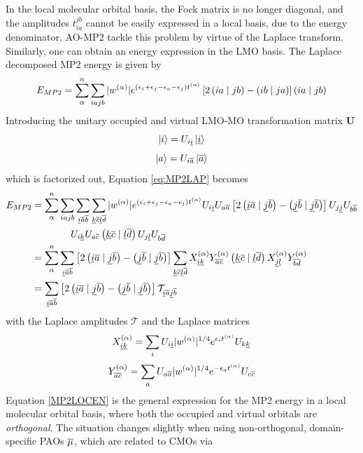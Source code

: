 In the local molecular orbital basis, the Fock matrix is no longer diagonal, and the amplitudes $t_{ia}^{jb}$ cannot be easily expressed in a local basis, due to the energy denominator. AO-MP2 tackle this problem by virtue of the Laplace transform. Similarly, one can obtain an energy expression in the LMO basis. The Laplace decomposed MP2 energy is given by
\begin{equation}
E_{MP2} = \sum_{\alpha}^{n} \sum_{iajb} |w^{(\alpha)}| e^{(\epsilon_i + \epsilon_j - \epsilon_a - \epsilon_j)t^{(\alpha)}} \left[2\left( ia \mid jb \right) - \left( ib \mid ja \right)\right] \left( ia \mid jb \right)  
\label{eq:MP2LAP}
\end{equation}
\noindent Introducing the unitary occupied and virtual LMO-MO transformation matrix $\mathbf{U}$ 
\begin{equation}
\ket{i} = U_{i\underline{i}} \ket{\underline{i}}
\end{equation} 
\begin{equation}
\ket{a} = U_{i\overline{a}} \ket{\overline{a}}
\end{equation}
\noindent which is factorized out, Equation \ref{eq:MP2LAP} becomes
\begin{equation}
\begin{split}
E_{MP2} &= \sum_{\alpha}^{n} \sum_{iajb} \sum_{\underline{i}\overline{a}\overline{b}} \sum_{\underline{k}\overline{c}\underline{l}\overline{d}} |w^{(\alpha)}| e^{(\epsilon_i + \epsilon_j - \epsilon_a - \epsilon_j)t^{(\alpha)}} U_{i\underline{i}} U_{a\overline{a}} \left[2\left( \underline{i}\overline{a} \mid \underline{j}\overline{b} \right) - \left( \underline{j}\overline{b} \mid \underline{j}\overline{b} \right)\right] U_{j\underline{j}} U_{b\overline{b}} \\
& \qquad \qquad U_{i\underline{k}} U_{a\overline{c}} \left( \underline{k}\overline{c} \mid \underline{l}\overline{d} \right) U_{j\underline{l}} U_{b\overline{d}} \\  
&= \sum_{\alpha}^{n} \sum_{\underline{i}\overline{a}\overline{b}} \left[2\left( \underline{i}\overline{a} \mid \underline{j}\overline{b} \right) - \left( \underline{j}\overline{b} \mid \underline{j}\overline{b} \right)\right] \sum_{\underline{k}\overline{c}\underline{l}\overline{d}} X_{\underline{i}\underline{k}}^{(\alpha)} Y_{\overline{a}\overline{c}}^{(\alpha)} \left( \underline{k}\overline{c} \mid \underline{l}\overline{d} \right) X_{\underline{j}\underline{l}}^{(\alpha)} Y_{\overline{b}\overline{d}}^{(\alpha)} \\
&= \sum_{\underline{i}\overline{a}\overline{b}} \left[2\left( \underline{i}\overline{a} \mid \underline{j}\overline{b} \right) - \left( \underline{j}\overline{b} \mid \underline{j}\overline{b} \right)\right] \mathcal{T}_{\underline{i}\overline{a}\underline{j}\overline{b}}
\end{split}
\label{MP2LOCEN}
\end{equation}
\noindent with the Laplace amplitudes $\mathcal{T}$ and the Laplace matrices
\begin{equation}
X_{\underline{i}\underline{k}}^{(\alpha)} = \sum_i U_{i\underline{i}} |w^{(\alpha)}|^{1/4} e^{\epsilon_i t^{(\alpha)}} U_{k\underline{k}}
\end{equation}
\begin{equation}
Y_{\overline{a}\overline{c}}^{(\alpha)} = \sum_a U_{a\overline{a}} |w^{(\alpha)}|^{1/4} e^{-\epsilon_a t^{(\alpha)}} U_{c\overline{c}}
\end{equation}
\noindent Equation \ref{MP2LOCEN} is the general expression for the MP2 energy in a local molecular orbital basis, where both the occupied and virtual orbitals are \emph{orthogonal}. The situation changes slightly when using non-orthogonal, domain-specific PAOs $\overline{\mu}$, which are related to CMOs via
